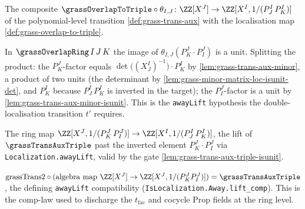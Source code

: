 \begin{definition}

  \label{def:grass-trans-aux-triple}
  The composite $\grassOverlapToTriple\circ\theta_{I,J}\colon
  \ZZ[X^J]\to\ZZ[X^I,1/(P^I_J\,P^I_K)]$ of the polynomial-level transition
  \cref{def:grass-trans-aux} with the localisation map
  \cref{def:grass-overlap-to-triple}.
\end{definition}

\begin{lemma}

  \label{lem:grass-trans-aux-triple-isunit}
  In $\grassOverlapRing\,I\,J\,K$ the image of $\theta_{I,J}(P^J_K\cdot P^J_I)$ is a
  unit. Splitting the product: the $P^J_K$-factor equals $\det\big((X^I_J)^{-1}\big)
  \cdot P^I_K$ by \cref{lem:grass-trans-aux-minor}, a product of two units (the
  determinant by \cref{lem:grass-minor-matrix-loc-isunit-det}, and $P^I_K$ because
  $P^I_J\,P^I_K$ is inverted in the target); the $P^J_I$-factor is a unit by
  \cref{lem:grass-trans-aux-minor-isunit}. This is the \texttt{awayLift} hypothesis
  the double-localisation transition $t'$ requires.
\end{lemma}

\begin{definition}

  \label{def:grass-trans2}
  The ring map $\ZZ[X^J,1/(P^J_K\,P^J_I)]\to\ZZ[X^I,1/(P^I_J\,P^I_K)]$, the lift of
  $\grassTransAuxTriple$ past the inverted element $P^J_K\cdot P^J_I$ via
  \texttt{Localization.awayLift}, valid by the gate
  \cref{lem:grass-trans-aux-triple-isunit}.
\end{definition}

\begin{lemma}

  \label{lem:grass-trans2-comp-algebramap}
  $\mathrm{grassTrans2}\circ(\text{algebra map }\ZZ[X^J]\to\ZZ[X^J,1/(P^J_K P^J_I)]) =
  \grassTransAuxTriple$, the defining \texttt{awayLift} compatibility
  (\texttt{IsLocalization.Away.lift\_comp}). This is the comp-law used to discharge
  the $t_{\mathrm{fac}}$ and cocycle Prop fields at the ring level.
\end{lemma}

